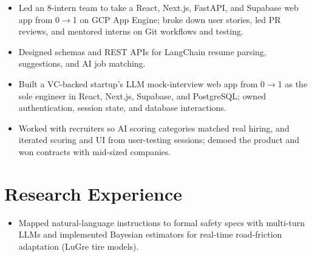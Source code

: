 \documentclass[11pt, letterpaper]{article}
\begin{document}
\vspace{1pt}
\begin{itemize}
  \item Led an 8-intern team to take a React, Next.js, FastAPI, and Supabase web app from 0$\to$1 on GCP App Engine; broke down user stories, led PR reviews, and mentored interns on Git workflows and testing.
  \item Designed schemas and REST APIs for LangChain resume parsing, suggestions, and AI job matching.
\end{itemize}

\vspace{1pt}
\begin{itemize}
  \item Built a VC-backed startup's LLM mock-interview web app from 0$\to$1 as the sole engineer in React, Next.js, Supabase, and PostgreSQL; owned authentication, session state, and database interactions.
  \item Worked with recruiters so AI scoring categories matched real hiring, and iterated scoring and UI from user-testing sessions; demoed the product and won contracts with mid-sized companies.
\end{itemize}

\section{Research Experience}
\begin{itemize}
  \item Mapped natural-language instructions to formal safety specs with multi-turn LLMs and implemented Bayesian estimators for real-time road-friction adaptation (LuGre tire models).
\end{itemize}
\end{document}
